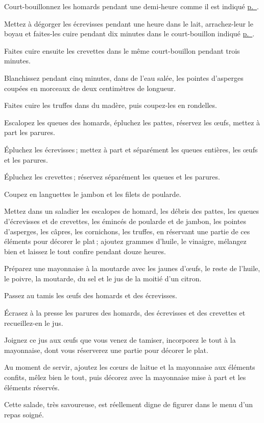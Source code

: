 Court-bouillonnez les homards pendant une demi-heure comme il est indiqué
\hyperlink{p0284}{p. \pageref{pg0284}}.

Mettez à dégorger les écrevisses pendant une heure dans le lait, arrachez-leur
le boyau et faites-les cuire pendant dix minutes dans le court-bouillon indiqué
\hyperlink{p0287}{p. \pageref{pg0287}}.

Faites cuire ensuite les crevettes dans le même court-bouillon pendant trois
minutes.

Blanchissez pendant cinq minutes, dans de l'eau salée, les pointes d'asperges
coupées en morceaux de deux centimètres de longueur.

Faites cuire les truffes dans du madère, puis coupez-les en rondelles.

Escalopez les queues des homards, épluchez les pattes, réservez les œufs, mettez
à part les parures.

Épluchez les écrevisses ; mettez à part et séparément les queues entières, les
œufs et les parures.

Épluchez les crevettes ; réservez séparément les queues et les parures.

Coupez en languettes le jambon et les filets de poularde.

Mettez dans un saladier les escalopes de homard, les débris des pattes, les
queues d'écrevisses et de crevettes, les émincés de poularde et de jambon, les
pointes d'asperges, les câpres, les cornichons, les truffes, en réservant une
partie de ces éléments pour décorer le plat ; ajoutez {\mmm} grammes
d'huile, le vinaigre, mélangez bien et laissez le tout confire pendant douze
heures.

Préparez une mayonnaise à la moutarde avec les jaunes d'œufs, le reste de
l'huile, le poivre, la moutarde, du sel et le jus de la moitié d'un citron.

Passez au tamis les œufs des homards et des écrevisses.

Écrasez à la presse les parures des homards, des écrevisses et des crevettes et
recueillez-en le jus.

Joignez ce jus aux œufs que vous venez de tamiser, incorporez le tout à la
mayonnaise, dont vous réserverez une partie pour décorer le plat.

Au moment de servir, ajoutez les cœurs de laitue et la mayonnaise aux éléments
confits, mêlez bien le tout, puis décorez avec la mayonnaise mise à part et les
éléments réservés.

Cette salade, très savoureuse, est réellement digne de figurer dans le menu d'un
repas soigné.

